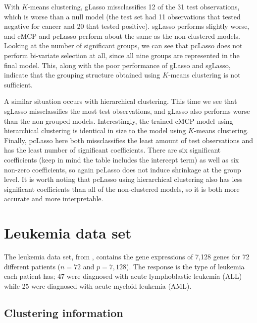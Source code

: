 \documentclass[11pt]{article}
\newcommand{\citeay}[1]{\citeauthor{#1} \citeyear{#1}}
\begin{document}
With $K$-means clustering, gLasso missclassifies 12 of the 31 test observations, which is worse than a null model (the test set had 11 observations that tested negative for cancer and 20 that tested positive). sgLasso performs slightly worse, and cMCP and pcLasso perform about the same as the non-clustered models. Looking at the number of significant groups, we can see that pcLasso does not perform bi-variate selection at all, since all nine groups are represented in the final model. This, along with the poor performance of gLasso and sgLasso, indicate that the grouping structure obtained using $K$-means clustering is not sufficient. 

A similar situation occurs with hierarchical clustering. This time we see that sgLasso missclassifies the most test observations, and gLasso also performs worse than the non-grouped models. Interestingly, the trained cMCP model using hierarchical clustering is identical in size to the model using $K$-means clustering. Finally, pcLasso here both missclassifies the least amount of test observations and has the least number of significant coefficients. There are six significant coefficients (keep in mind the table includes the intercept term) as well as six non-zero coefficients, so again pcLasso does not induce shrinkage at the group level. It is worth noting that pcLasso using hierarchical clustering also has less significant coefficients than all of the non-clustered models, so it is both more accurate and more interpretable. 

\section{Leukemia data set}

The leukemia data set, from \citeay{golub1999molecular}, contains the gene expressions of 7,128 genes for 72 different patients ($n = 72$ and $p = 7,128$). The response is the type of leukemia each patient has; 47 were diagnosed with acute lymphoblastic leukemia (ALL) while 25 were diagnosed with acute myeloid leukemia (AML). 

\subsection{Clustering information}
\end{document}
